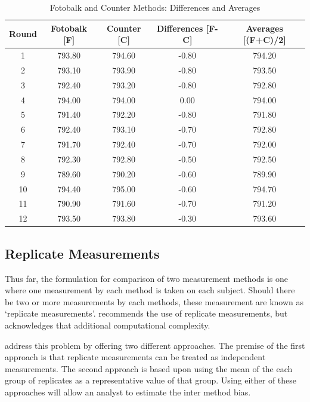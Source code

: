 \documentclass[12pt, a4paper]{report}
\begin{document}
	
	\newpage
	\begin{table}[tbh]
		\begin{center}
			
			\begin{tabular}{|c|c|c|c|c|}
				\hline
				Round & Fotobalk [F] & Counter [C] & Differences [F-C] & Averages [(F+C)/2] \\
				\hline
				1 & 793.80 & 794.60 & -0.80 & 794.20 \\
				2 & 793.10 & 793.90 & -0.80 & 793.50 \\
				3 & 792.40 & 793.20 & -0.80 & 792.80 \\
				4 & 794.00 & 794.00 & 0.00 & 794.00 \\
				5 & 791.40 & 792.20 & -0.80 & 791.80 \\
				6 & 792.40 & 793.10 & -0.70 & 792.80 \\
				7 & 791.70 & 792.40 & -0.70 & 792.00 \\
				8 & 792.30 & 792.80 & -0.50 & 792.50 \\
				9 & 789.60 & 790.20 & -0.60 & 789.90 \\
				10 & 794.40 & 795.00 & -0.60 & 794.70 \\
				11 & 790.90 & 791.60 & -0.70 & 791.20 \\
				12 & 793.50 & 793.80 & -0.30 & 793.60 \\
				\hline
			\end{tabular}
			\caption{Fotobalk and Counter Methods: Differences and Averages}
		\end{center}
	\end{table}
	
	
	
	


	\subsection{Replicate Measurements}
	
	Thus far, the formulation for comparison of two measurement
	methods is one where one measurement by each method is taken on
	each subject. Should there be two or more measurements by each
	methods, these measurement are known as `replicate measurements'.
	\citet{BXC2008} recommends the use of replicate measurements, but
	acknowledges that  additional computational complexity.
	
	\citet*{BA86} address this problem by offering two different
	approaches. The premise of the first approach is that replicate
	measurements can be treated as independent measurements. The
	second approach is based upon using the mean of the each group of
	replicates as a representative value of that group. Using either
	of these approaches will allow an analyst to estimate the inter
	method bias.
	
\end{document}

